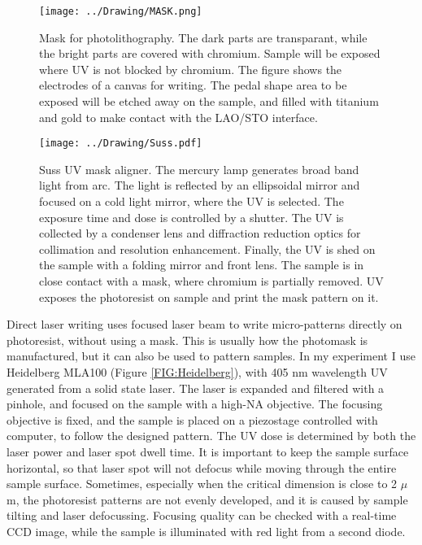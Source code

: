 \documentclass[pdftex, sectionletters]{pittetd}    %
\begin{document}
\begin{figure}[h!]
	\centering
	\texttt{[image: ../Drawing/MASK.png]}
	\caption{Mask for photolithography. The dark parts are transparant, while the bright parts are covered with chromium. Sample will be exposed where UV is not blocked by chromium. The figure shows the electrodes of a canvas for writing. The pedal shape area to be exposed will be etched away on the sample, and filled with titanium and gold to make contact with the LAO/STO interface.}
	\label{FIG:MASK}
\end{figure}

\begin{figure}[hp]
	\centering
	\texttt{[image: ../Drawing/Suss.pdf]}
	\caption{Suss UV mask aligner. The mercury lamp generates broad band light from arc. The light is reflected by an ellipsoidal mirror and focused on a cold light mirror, where the UV is selected. The exposure time and dose is controlled by a shutter. The UV is collected by a condenser lens and diffraction reduction optics for collimation and resolution enhancement. Finally, the UV is shed on the sample with a folding mirror and front lens. The sample is in close contact with a mask, where chromium is partially removed. UV exposes the photoresist on sample and print the mask pattern on it.}
	\label{FIG:Suss}
\end{figure}

Direct laser writing uses focused laser beam to write micro-patterns directly on photoresist, without using a mask. This is usually how the photomask is manufactured, but it can also be used to pattern samples. In my experiment I use Heidelberg MLA100 (Figure \ref{FIG:Heidelberg}), with 405 nm wavelength UV generated from a solid state laser. The laser is expanded and filtered with a pinhole, and focused on the sample with a high-NA objective. The focusing objective is fixed, and the sample is placed on a piezostage controlled with computer, to follow the designed pattern. The UV dose is determined by both the laser power and laser spot dwell time. It is important to keep the sample surface horizontal, so that laser spot will not defocus while moving through the entire sample surface. Sometimes, especially when the critical dimension is close to 2 $\mu$m, the photoresist patterns are not evenly developed, and it is caused by sample tilting and laser defocussing. Focusing quality can be checked with a real-time CCD image, while the sample is illuminated with red light from a second diode.
\end{document}
